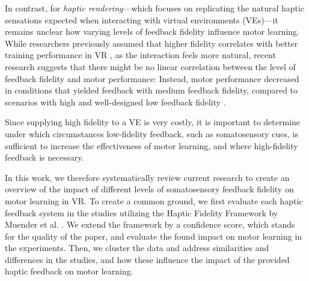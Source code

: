 In contrast, for \textit{haptic rendering}---which focuses on replicating the natural haptic sensations expected when interacting with virtual environments (VEs)---it remains unclear how varying levels of feedback fidelity influence motor learning.
While researchers previously assumed that higher fidelity correlates with better training performance in VR \cite{Caird1996PersistentTraining, Waller1998TheTraining}, as the interaction feels more natural, recent research suggests that there might be no linear correlation between the level of feedback fidelity and motor performance: Instead, motor performance decreased in conditions that yielded feedback with medium feedback fidelity, compared to scenarios with high and well-designed low feedback fidelity \cite{MahdiNabiyouni201520153DUI.}.

Since supplying high fidelity to a VE is very costly, it is important to determine under which circumstances low-fidelity feedback, such as somatosensory cues, is sufficient to increase the effectiveness of motor learning, and where high-fidelity feedback is necessary. 

In this work, we therefore systematically review current research to create an overview of the impact of different levels of somatosensory feedback fidelity on motor learning in VR. To create a common ground, we first evaluate each haptic feedback system in the studies utilizing the Haptic Fidelity Framework by Muender et al. \cite{Muender2022HapticReality}. We extend the framework by a confidence score, which stands for the quality of the paper, and evaluate the found impact on motor learning in the experiments. Then, we cluster the data and address similarities and differences in the studies, and how these influence the impact of the provided haptic feedback on motor learning. 
